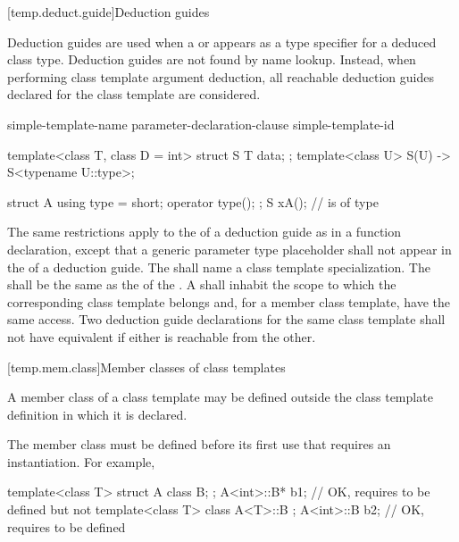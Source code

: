 [temp.deduct.guide]{Deduction guides}
%

\pnum
Deduction guides are used
when a  or 
appears as a type specifier
for a deduced class type.
Deduction guides are not found by name lookup.
Instead, when performing class template argument deduction,
all reachable deduction guides declared for the class template are considered.

\begin{bnf}
\br
     simple-template-name \terminal{(} parameter-declaration-clause \terminal{)} \terminal{->} simple-template-id  \terminal{;}
\end{bnf}

\pnum
\begin{example}
\begin{codeblock}
template<class T, class D = int>
struct S {
  T data;
};
template<class U>
S(U) -> S<typename U::type>;

struct A {
  using type = short;
  operator type();
};
S x{A()};           //  is of type 
\end{codeblock}
\end{example}

\pnum
The same restrictions apply
to the 
of a deduction guide
as in a function declaration,
except that a generic parameter type placeholder
shall not appear in the  of
a deduction guide.
The 
shall name a class template specialization.
The 
shall be the same 
as the 
of the .
A 
shall inhabit the scope
to which the corresponding class template belongs
and, for a member class template, have the same access.
Two deduction guide declarations
for the same class template
shall not have equivalent 
if either is reachable from the other.

[temp.mem.class]{Member classes of class templates}

\pnum
A member class of a class template may be defined outside the class template
definition in which it is declared.
\begin{note}
The member class must be defined before its first use that requires
an instantiation.
For example,
\begin{codeblock}
template<class T> struct A {
  class B;
};
A<int>::B* b1;                          // OK, requires  to be defined but not 
template<class T> class A<T>::B { };
A<int>::B  b2;                          // OK, requires  to be defined
\end{codeblock}
\end{note}

